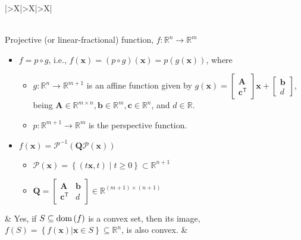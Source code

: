 \documentclass{article}
\newcommand{\dom}[1]{\ensuremath{\textnormal{dom}\left(#1\right)}} %
\begin{document}
\begin{table}[ht!]
\begin{tabularx}{\textwidth}{|>{\setlength\hsize{1\hsize}\setlength\linewidth{\hsize}}X|>{\setlength\hsize{.9\hsize}\setlength\linewidth{\hsize}}X|>{\setlength\hsize{1.1\hsize}\setlength\linewidth{\hsize}}X|}
\begin{itemize}[leftmargin=*]
        \end{itemize} \\
        \hline
        Projective (or linear-fractional) function, \(f: \mathbb{R}^{n} \rightarrow \mathbb{R}^{m}\)
        \begin{itemize}[leftmargin=*]
            \item \(f = p \circ g\), i.e., \(f(\mathbf{x}) = (p\circ g)(\mathbf{x}) = p(g(\mathbf{x}))\), where
                \begin{itemize}[label={$\triangleright$}]
                    \item \(g: \mathbb{R}^{n} \rightarrow \mathbb{R}^{m+1}\) is an affine function given by \(g(\mathbf{x}) = \begin{bmatrix}
                        \mathbf{A}\\
                        \mathbf{c}^\mathsf{T}
                    \end{bmatrix} \mathbf{x} + \begin{bmatrix}
                        \mathbf{b} \\
                        d
                    \end{bmatrix}\), being \(\mathbf{A}\in \mathbb{R}^{m \times n}, \mathbf{b} \in \mathbb{R}^{m}, \mathbf{c} \in \mathbb{R}^{n}\), and \(d \in \mathbb{R}\).
                    \item \(p: \mathbb{R}^{m+1} \rightarrow \mathbb{R}^{m}\) is the perspective function.
                \end{itemize}
            \item \(f(\mathbf{x}) = \mathcal{P}^{-1}(\mathbf{Q}\mathcal{P}(\mathbf{x}))\)
                \begin{itemize}[label={$\triangleright$}]
                    \item \(\mathcal{P}(\mathbf{x}) = \left\{ (t\mathbf{x}, t) \mid t \geq 0 \right\} \subset \mathbb{R}^{n+1}\)
                    \item \(\mathbf{Q} = \begin{bmatrix}
                        \mathbf{A} & \mathbf{b} \\
                        \mathbf{c}^\mathsf{T} & d
                    \end{bmatrix} \in \mathbb{R}^{(m+1)\times(n+1)}\)
                \end{itemize}
        \end{itemize} & Yes, if \(S \subseteq \dom{f}\) is a convex set, then its image, \(f(S) = \left\{ f(\mathbf{x})|\mathbf{x}\in S \right\} \subseteq \mathbb{R}^{n}\), is also convex. & \vspace{-3.5ex} \begin{itemize}[leftmargin=*]

\end{itemize}
\end{tabularx}
\end{table}
\end{document}
